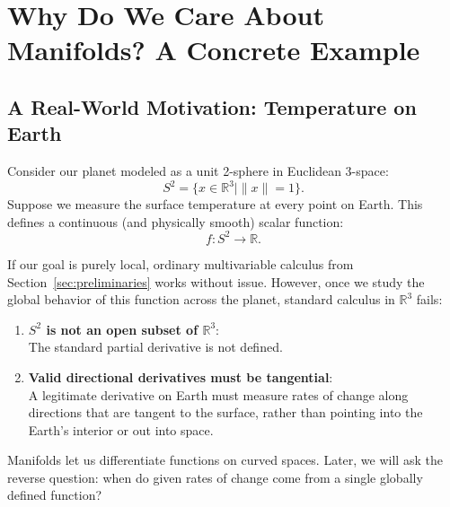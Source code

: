 \section{Why Do We Care About Manifolds? A Concrete Example}
    \label{sec:why_manifolds}

    \subsection{A Real-World Motivation: Temperature on Earth}
    \noindent
    \begin{minipage}[c]{0.62\textwidth}
        Consider our planet modeled as a unit 2-sphere in Euclidean 3-space:
        \begin{equation}
            S^2 = \{ x \in \mathbb{R}^3 \mid \|x\| = 1 \}.
        \end{equation}
        Suppose we measure the surface temperature at every point on Earth.
        This defines a continuous (and physically smooth) scalar function:
        \begin{equation}
            f \colon S^2 \to \mathbb{R}.
        \end{equation}
    \end{minipage}\hfill
    \begin{minipage}[c]{0.35\textwidth}
        \centering
        
    \end{minipage}
    \vspace{0.8em}

    If our goal is purely local, ordinary multivariable calculus from
    Section~\ref{sec:preliminaries} works without issue. However, once we
    study the global behavior of this function across the planet, standard
    calculus in $\mathbb{R}^3$ fails:
    \begin{enumerate}
        \item \textbf{$S^2$ is not an open subset of $\mathbb{R}^3$}:\\
            The standard partial derivative is not defined.
        \item \textbf{Valid directional derivatives must be tangential}:\\
            A legitimate derivative on Earth must measure rates of change
            along directions that are tangent to the surface, rather than
            pointing into the Earth's interior or out into space.
    \end{enumerate}
    Manifolds let us differentiate functions on curved spaces. Later, we will
    ask the reverse question: when do given rates of change come from a single
    globally defined function?

